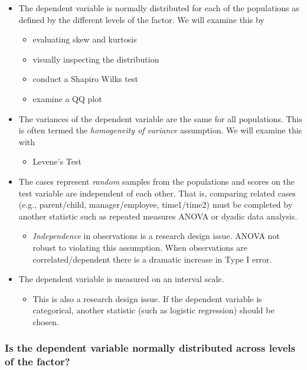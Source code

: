 \documentclass[
  english,
]{book}
\providecommand{\tightlist}{%
  \setlength{\itemsep}{0pt}\setlength{\parskip}{0pt}}
\begin{document}
\begin{itemize}
\tightlist
\item
  The dependent variable is normally distributed for each of the populations as defined by the different levels of the factor. We will examine this by

  \begin{itemize}
  \tightlist
  \item
    evaluating skew and kurtosis
  \item
    visually inspecting the distribution
  \item
    conduct a Shapiro Wilks test
  \item
    examine a QQ plot
  \end{itemize}
\item
  The variances of the dependent variable are the same for all populations. This is often termed the \emph{homogeneity of variance} assumption. We will examine this with

  \begin{itemize}
  \tightlist
  \item
    Levene's Test
  \end{itemize}
\item
  The cases represent \emph{random} samples from the populations and scores on the test variable are independent of each other. That is, comparing related cases (e.g., parent/child, manager/employee, time1/time2) must be completed by another statistic such as repeated measures ANOVA or dyadic data analysis.

  \begin{itemize}
  \tightlist
  \item
    \emph{Independence} in observations is a research design issue. ANOVA not robust to violating this assumption. When observations are correlated/dependent there is a dramatic increase in Type I error.
  \end{itemize}
\item
  The dependent variable is measured on an interval scale.

  \begin{itemize}
  \tightlist
  \item
    This is also a research design issue. If the dependent variable is categorical, another statistic (such as logistic regression) should be chosen.
  \end{itemize}
\end{itemize}

\hypertarget{is-the-dependent-variable-normally-distributed-across-levels-of-the-factor}{%
\subsubsection{Is the dependent variable normally distributed across levels of the factor?}\label{is-the-dependent-variable-normally-distributed-across-levels-of-the-factor}}
\end{document}
